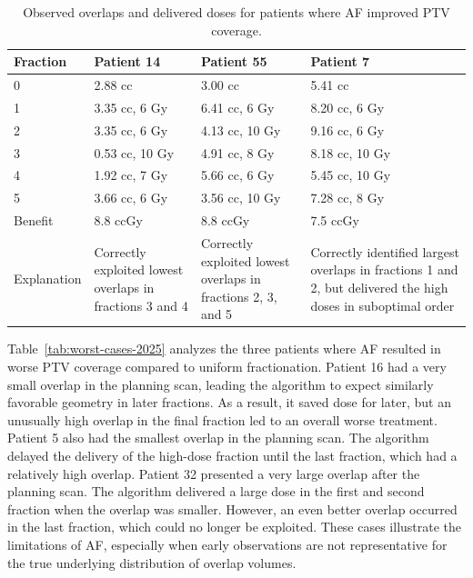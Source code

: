 \documentclass[11pt]{article}
\newcommand{\toprule}{\hline}
\newcommand{\midrule}{\hline}
\newcommand{\bottomrule}{\hline}
\begin{document}
\begin{table}[ht]
\centering
\caption{Observed overlaps and delivered doses for patients where AF improved PTV coverage.}
\label{tab:best-cases-2025}
\begin{tabular}{llll}
\toprule
Fraction & Patient 14 & Patient 55 & Patient 7 \\
\midrule
0 & 2.88 cc & 3.00 cc & 5.41 cc \\
1 & 3.35 cc, 6 Gy & 6.41 cc, 6 Gy & 8.20 cc, 6 Gy \\
2 & 3.35 cc, 6 Gy & 4.13 cc, 10 Gy & 9.16 cc, 6 Gy \\
3 & 0.53 cc, 10 Gy & 4.91 cc, 8 Gy & 8.18 cc, 10 Gy \\
4 & 1.92 cc, 7 Gy & 5.66 cc, 6 Gy & 5.45 cc, 10 Gy \\
5 & 3.66 cc, 6 Gy & 3.56 cc, 10 Gy & 7.28 cc, 8 Gy \\
Benefit & 8.8 ccGy & 8.8 ccGy & 7.5 ccGy \\
Explanation & Correctly exploited lowest overlaps in fractions 3 and 4 & Correctly exploited lowest overlaps in fractions 2, 3, and 5 & Correctly identified largest overlaps in fractions 1 and 2, but delivered the high doses in suboptimal order \\
\bottomrule
\end{tabular}
\end{table}

Table~\ref{tab:worst-cases-2025} analyzes the three patients where AF resulted in worse PTV coverage compared to uniform fractionation. Patient 16 had a very small overlap in the planning scan, leading the algorithm to expect similarly favorable geometry in later fractions. As a result, it saved dose for later, but an unusually high overlap in the final fraction led to an overall worse treatment. Patient 5 also had the smallest overlap in the planning scan. The algorithm delayed the delivery of the high-dose fraction until the last fraction, which had a relatively high overlap. Patient 32 presented a very large overlap after the planning scan. The algorithm delivered a large dose in the first and second fraction when the overlap was smaller. However, an even better overlap occurred in the last fraction, which could no longer be exploited. These cases illustrate the limitations of AF, especially when early observations are not representative for the true underlying distribution of overlap volumes.
\end{document}
